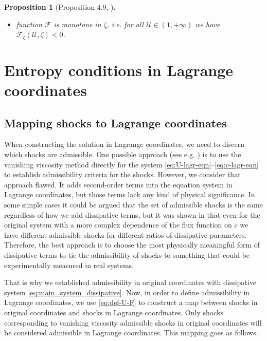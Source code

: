 \documentclass[12pt]{article}
\newtheorem{proposition}{Proposition}
\theoremstyle{definition}
\begin{document}
\begin{proposition}[Proposition 4.9, \cite{MR2024}]
\begin{itemize}
\begin{itemize}
\item[$\bullet$]
therefore, if $\mathcal U$, $\zeta$ are such that $\mathcal F_{\mathcal U} (\mathcal U, \zeta) > 0$, then $\mathcal F_{\mathcal U\mathcal U} (\mathcal U, \zeta) < 0$;
\end{itemize}
\item[($\mathcal F$4)]
function 
$\mathcal F$ is monotone in $\zeta$, i.e.  for all $\mathcal U\in(1, +\infty)$ we have $\mathcal F_\zeta(\mathcal U, \zeta) < 0$. \end{itemize}
\end{proposition}

\section{Entropy conditions in Lagrange coordinates}
\label{sec:entropy}

\subsection{Mapping shocks to Lagrange coordinates}
\label{sec:sec5-shock-mapping}
When constructing the solution in Lagrange coordinates, we need to discern which shocks are admissible. One possible approach (see e.g. \cite{Shen}) is to use the vanishing viscosity method directly for the system \eqref{eq:U-lagr-eqn}--\eqref{eq:c-lagr-eqn} to establish admissibility criteria for the shocks. However, we consider that approach flawed. It adds second-order terms into the equation system in Lagrange coordinates, but those terms lack any kind of physical significance. In some simple cases it could be argued that the set of admissible shocks is the same regardless of how we add dissipative terms, but it was shown in \cite{Bahetal} that even for the original system with a more complex dependence of the flux function on $c$ we have different admissible shocks for different ratios of dissipative parameters. Therefore, the best approach is to choose the most physically meaningful form of dissipative terms to tie the admissibility of shocks to something that could be experimentally measured in real systems.

That is why we established admissibility in original coordinates with dissipative system \eqref{eq:main_system_dissipative}. Now, in order to define admissibility in Lagrange coordinates, we use \eqref{eq:def-U-F} to construct a map between shocks in original coordinates and shocks in Lagrange coordinates. Only shocks corresponding to vanishing viscosity admissible shocks in original coordinates will be considered admissible in Lagrange coordinates. This mapping goes as follows. 
\end{document}
